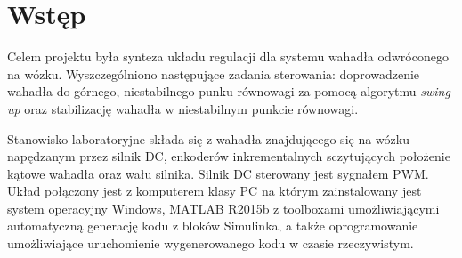 \section{Wstęp}
Celem projektu była synteza układu regulacji dla systemu wahadła odwróconego na wózku. Wyszczególniono następujące zadania sterowania: doprowadzenie wahadła do górnego, niestabilnego punku równowagi za pomocą algorytmu \textit{swing-up} oraz stabilizację wahadła w niestabilnym punkcie równowagi.

Stanowisko laboratoryjne składa się z wahadła znajdującego się na wózku napędzanym przez silnik DC, enkoderów inkrementalnych sczytujących położenie kątowe wahadła oraz wału silnika. Silnik DC sterowany jest sygnałem PWM. Układ połączony jest z komputerem klasy PC na którym zainstalowany jest system operacyjny Windows, MATLAB R2015b z toolboxami umożliwiającymi automatyczną generację kodu z bloków Simulinka, a także oprogramowanie umożliwiające uruchomienie wygenerowanego kodu w czasie rzeczywistym.


